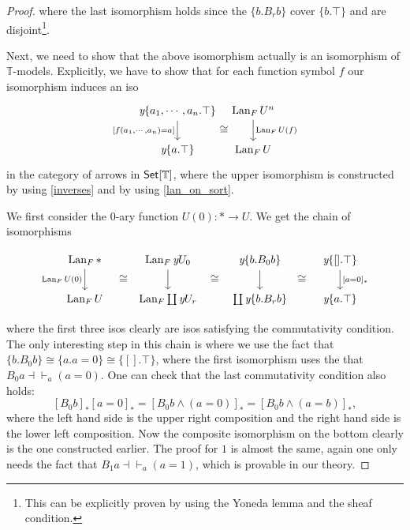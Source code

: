 \documentclass[a4paper]{amsproc}
\theoremstyle{plain}
\theoremstyle{definition}
\theoremstyle{remark}
\numberwithin{equation}{section}
\newcommand{\y}{\textit{y}}
\DeclareMathOperator{\Lan}{Lan}
\newcommand{\Set}{\textup{\textsf{Set}}}
\begin{document}
\begin{proof}
where the last isomorphism holds since the $\{b.B_r b\}$ cover $\{b.\top\}$ and are disjoint\footnote{This can be explicitly proven by using the Yoneda lemma and the sheaf condition.}.

Next, we need to show that the above isomorphism actually is an isomorphism of $\mathbb{T}$-models. Explicitly, we have to show that for each function symbol $f$ our isomorphism induces an iso
\[
\begin{tikzcd}[column sep=tiny]
    {\y \{a_1,\cdots,a_n . \top \}} \arrow[d, "{[f(a_1,\cdots,a_n) = a]}"'] \arrow[r, "\cong"',phantom, shift right=7] & \Lan_F U^n \arrow[d, "\Lan_F U(f)"] \\
    \y \{a . \top \}                                                                                           & \Lan_F U
\end{tikzcd}
\]
in the category of arrows in $\Set[\mathbb{T}]$, where the upper isomorphism is constructed by using \ref{inverses} and by using \ref{lan_on_sort}.

We first consider the 0-ary function $U(0): * \to U$. We get the chain of isomorphisms

\[
\begin{tikzcd}
\Lan_F * \arrow[d, "\Lan_F U(0)"'] \arrow[r, "\cong"',phantom, shift right=7] & \Lan_F \y U_0 \arrow[d] \arrow[r, "\cong"',phantom, shift right=7] & \y \{b . B_0 b \} \arrow[d] \arrow[r, "\cong"',phantom, shift right=7] & {\y \{[].\top\}} \arrow[d, "{[a=0]_*}"] \\
\Lan_F U                                                             & \Lan_F \coprod \y U_r                                      & \coprod \y \{ b . B_r b\}                                      & \y\{a.\top\}
\end{tikzcd}
\]

where the first three isos clearly are isos satisfying the commutativity condition. The only interesting step in this chain is where we use the fact that $\{b . B_0 b\} \cong \{a . a = 0\} \cong \{[]. \top\}$, where the first isomorphism uses the that $B_0 a \dashv \vdash_a (a = 0)$. One can check that the last commutativity condition also holds:
\[
[B_0 b]_* [a=0]_* = [B_0 b \wedge (a = 0)]_* = [B_0 b \wedge (a=b)]_*,
\]
where the left hand side is the upper right composition and the right hand side is the lower left composition. Now the composite isomorphism on the bottom clearly is the one constructed earlier. The proof for $1$ is almost the same, again one only needs the fact that $B_1 a \dashv \vdash_a (a = 1)$, which is provable in our theory.


\end{proof}
\end{document}
